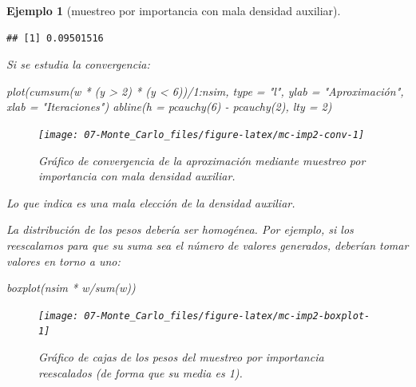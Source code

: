 \documentclass[
]{book}
\newenvironment{Shaded}{\begin{snugshade}}{\end{snugshade}}
\newcommand{\AttributeTok}[1]{\textcolor[rgb]{0.77,0.63,0.00}{#1}}
\newcommand{\DecValTok}[1]{\textcolor[rgb]{0.00,0.00,0.81}{#1}}
\newcommand{\FunctionTok}[1]{\textcolor[rgb]{0.00,0.00,0.00}{#1}}
\newcommand{\NormalTok}[1]{#1}
\newcommand{\SpecialCharTok}[1]{\textcolor[rgb]{0.00,0.00,0.00}{#1}}
\newcommand{\StringTok}[1]{\textcolor[rgb]{0.31,0.60,0.02}{#1}}
\theoremstyle{break}
\newtheorem{example}{Ejemplo}[chapter]
\theoremstyle{nonumberplain}
\begin{document}
\begin{example}[muestreo por importancia con mala densidad auxiliar]
\begin{verbatim}
## [1] 0.09501516
\end{verbatim}

Si se estudia la convergencia:

\begin{Shaded}
\begin{Highlighting}[]
\FunctionTok{plot}\NormalTok{(}\FunctionTok{cumsum}\NormalTok{(w }\SpecialCharTok{*}\NormalTok{ (y }\SpecialCharTok{\textgreater{}} \DecValTok{2}\NormalTok{) }\SpecialCharTok{*}\NormalTok{ (y }\SpecialCharTok{\textless{}} \DecValTok{6}\NormalTok{))}\SpecialCharTok{/}\DecValTok{1}\SpecialCharTok{:}\NormalTok{nsim, }\AttributeTok{type =} \StringTok{"l"}\NormalTok{, }\AttributeTok{ylab =} \StringTok{"Aproximación"}\NormalTok{, }\AttributeTok{xlab =} \StringTok{"Iteraciones"}\NormalTok{)}
\FunctionTok{abline}\NormalTok{(}\AttributeTok{h =} \FunctionTok{pcauchy}\NormalTok{(}\DecValTok{6}\NormalTok{) }\SpecialCharTok{{-}} \FunctionTok{pcauchy}\NormalTok{(}\DecValTok{2}\NormalTok{), }\AttributeTok{lty =} \DecValTok{2}\NormalTok{)}
\end{Highlighting}
\end{Shaded}

\begin{figure}[!htb]

{\centering \texttt{[image: 07-Monte\_Carlo\_files/figure-latex/mc-imp2-conv-1]} 

}

\caption{Gráfico de convergencia de la aproximación mediante muestreo por importancia con mala densidad auxiliar.}\label{fig:mc-imp2-conv}
\end{figure}

Lo que indica es una mala elección de la densidad auxiliar.

La distribución de los pesos debería ser homogénea.
Por ejemplo, si los reescalamos para que su suma sea el número de valores generados, deberían tomar valores en torno a uno:

\begin{Shaded}
\begin{Highlighting}[]
\FunctionTok{boxplot}\NormalTok{(nsim }\SpecialCharTok{*}\NormalTok{ w}\SpecialCharTok{/}\FunctionTok{sum}\NormalTok{(w))  }
\end{Highlighting}
\end{Shaded}

\begin{figure}[!htb]

{\centering \texttt{[image: 07-Monte\_Carlo\_files/figure-latex/mc-imp2-boxplot-1]} 

}

\caption{Gráfico de cajas de los pesos del muestreo por importancia reescalados (de forma que su media es 1).}\label{fig:mc-imp2-boxplot}
\end{figure}

\end{example}
\end{document}
